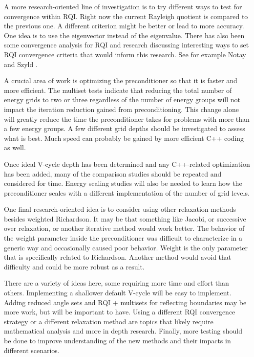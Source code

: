 A more research-oriented line of investigation is to try different ways to test for convergence within RQI. Right now the current Rayleigh quotient is compared to the previous one. A different criterion might be better or lead to more accuracy. One idea is to use the eigenvector instead of the eigenvalue. There has also been some convergence analysis for RQI and research discussing interesting ways to set RQI convergence criteria that would inform this research. See for example Notay \cite{Notay2003} and Szyld \cite{Szyld2011}.
  
A crucial area of work is optimizing the preconditioner so that it is faster and more efficient. The multiset tests indicate that reducing the total number of energy grids to two or three regardless of the number of energy groups will not impact the iteration reduction gained from preconditioning. This change alone will greatly reduce the time the preconditioner takes for problems with more than a few energy groups. A few different grid depths should be investigated to assess what is best. Much speed can probably be gained by more efficient C++ coding as well. 

Once ideal V-cycle depth has been determined and any C++-related optimization has been added, many of the comparison studies should be repeated and considered for time. Energy scaling studies will also be needed to learn how the preconditioner scales with a different implementation of the number of grid levels. 
  
One final research-oriented idea is to consider using other relaxation methods besides weighted Richardson. It may be that something like Jacobi, or successive over relaxation, or another iterative method would work better. The behavior of the weight parameter inside the preconditioner was difficult to characterize in a generic way and occasionally caused poor behavior. Weight is the only parameter that is specifically related to Richardson. Another method would avoid that difficulty and could be more robust as a result. 

There are a variety of ideas here, some requiring more time and effort than others. Implementing a shallower default V-cycle will be easy to implement. Adding reduced angle sets and RQI + multisets for reflecting boundaries may be more work, but will be important to have. Using a different RQI convergence strategy or a different relaxation method are topics that likely require mathematical analysis and more in depth research. Finally, more testing should be done to improve understanding of the new methods and their impacts in different scenarios.  

